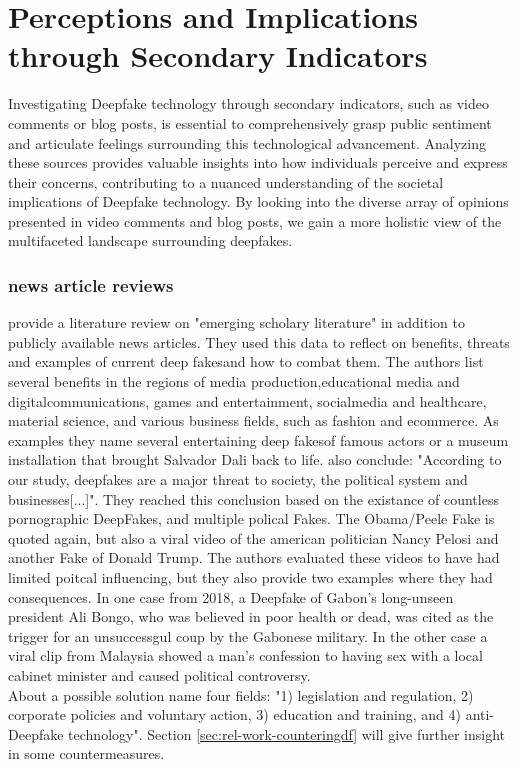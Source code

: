 \documentclass[
  a4paper,  %
  twoside,  %
  bibliography=totoc,
  headsepline,
  cleardoublepage=empty,
  parskip=half,
  draft=false
]{scrbook}
\begin{document}
\section{Perceptions and Implications through Secondary Indicators} 
\label{sec:rel-secondary}

Investigating Deepfake technology through secondary indicators, such as video comments or blog posts, is essential to comprehensively grasp public sentiment and articulate feelings surrounding this technological advancement. Analyzing these sources provides valuable insights into how individuals perceive and express their concerns, contributing to a nuanced understanding of the societal implications of Deepfake technology. By looking into the diverse array of opinions presented in video comments and blog posts, we gain a more holistic view of the multifaceted landscape surrounding deepfakes.

\subsubsection*{news article reviews}
\citet{westerlundEmergenceDeepfakeTechnology2019a} provide a literature review on "emerging scholary literature" in addition to publicly available news articles. They used this data to reflect on benefits, threats and examples of current deep fakesand how to combat them. The authors list several benefits in the regions of media production,educational media and digitalcommunications, games and entertainment, socialmedia and healthcare, material science, and various business fields, such as fashion and ecommerce. As examples they name several entertaining deep fakesof famous actors or a museum installation that brought Salvador Dali back to life.  also conclude: "According to our study, deepfakes are a major threat to society, the political system and businesses[...]". They reached this conclusion based on the existance of countless pornographic DeepFakes, and multiple polical Fakes. The Obama/Peele Fake is quoted again, but also a viral video of the american politician Nancy Pelosi and another Fake of Donald Trump. The authors evaluated these videos to have had limited poitcal influencing, but they also provide two examples where they had consequences. In one case from 2018, a Deepfake of Gabon's long-unseen president Ali Bongo, who was believed in poor health or dead, was cited as the trigger for an unsuccessgul coup by the Gabonese military. In the other case a viral clip from Malaysia showed a man's confession to having sex with a local cabinet minister and caused political controversy. \\
About a possible solution  name four fields: "1) legislation and regulation, 2) corporate policies and voluntary action, 3) education and training, and 4) anti-Deepfake technology". Section \ref{sec:rel-work-counteringdf} will give further insight in some countermeasures.
\end{document}
